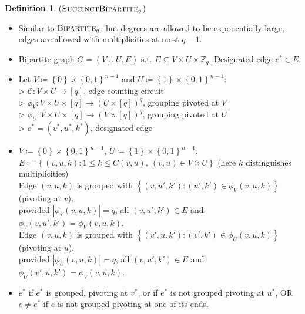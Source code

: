 \documentclass[10pt,a4paper]{article}
\theoremstyle{definition}
\newtheorem{definition}[theorem]{Definition}
\theoremstyle{remark}
\newcommand{\contour}[2]{#2}
\def\set#1{\left\{#1\right\}}
\newcommand{\bbZ}{\ensuremath{\mathbb{Z}}}
\newcommand{\calC}{\mathcal{C}}
\newcommand{\bit}{\ensuremath{\set{0,1}}}
\newcommand{\bipartite}{\ensuremath{\textsc{Bipartite}}}
\newcommand{\sucBipartite}{\ensuremath{\textsc{SuccinctBipartite}}}
\begin{document}
\noindent
\begin{minipage}{\linewidth}
\begin{definition}
	\label{def:succ-bipartite} \contour{black}{($\sucBipartite_q$)}\vspace{-5pt}
	\begin{itemize}[leftmargin=2.15cm,itemsep=4pt]
		\item[\slshape Principle:] Similar to $\bipartite_q$, but degrees are allowed to be exponentially large, edges are allowed with multiplicities at most $q-1$.
		\item[\slshape Object:] Bipartite graph $G = (V \cup U, E)$ s.t. $E \subseteq V \times U \times \bbZ_q$. Designated edge $e^* \in E$.
		\item[\slshape Inputs:] Let $V \coloneqq \set{0} \times \bit^{n-1}$ and $U \coloneqq \set{1} \times \bit^{n-1}$:\\
	$\triangleright$ $\calC:V \times U \to [q]$, edge counting circuit\\
	$\triangleright$ $\phi_V: V \times U \times [q] \to (U \times [q])^{q}$, grouping pivoted at $V$\\
	$\triangleright$ $\phi_U: V \times U \times [q] \to (V \times [q])^{q}$, grouping pivoted at $U$\\
	$\triangleright$ $e^* = (v^*, u^*, k^*)$, designated edge
		\item[\slshape Encoding:] $V \coloneqq \set{0} \times \bit^{n-1}$, $U \coloneqq \set{1} \times \bit^{n-1}$,\\
	$E \coloneqq \set{(v,u,k) : 1 \le k \le C(v,u),\ (v,u) \in V \times U}$ (here $k$ distinguishes multiplicities)\\
	Edge $(v,u,k)$ is grouped with $\set{(v, u', k') : (u',k') \in \phi_V(v,u,k)}$ (pivoting at $v$),\\
	\hspace*{1cm} provided $|\phi_V(v,u,k)| = q$, all $(v,u',k') \in E$ and $\phi_V(v,u',k') = \phi_V(v,u,k)$.\\
	Edge $(v,u,k)$ is grouped with $\set{(v', u, k') : (v',k') \in \phi_U(v,u,k)}$ (pivoting at $u$),\\
	\hspace*{1cm} provided $|\phi_U(v,u,k)| = q$, all $(v,u',k') \in E$ and $\phi_U(v',u,k') = \phi_V(v,u,k)$.
		\item[\slshape Solutions:] $e^*$ if $e^*$ is grouped, pivoting at $v^*$, or if $e^*$ is not grouped pivoting at $u^*$, OR\\
	$e \ne e^*$ if $e$ is not grouped pivoting at one of its ends.
	\end{itemize}
\end{definition}
\end{minipage}\vspace{5mm}
\end{document}
